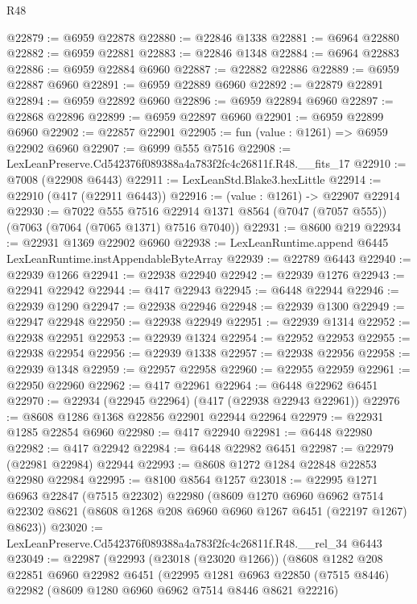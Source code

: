 \begin{lexlean}{R48}
\begin{coremodule}
@22879 := @6959 @22878
@22880 := @22846 @1338
@22881 := @6964 @22880
@22882 := @6959 @22881
@22883 := @22846 @1348
@22884 := @6964 @22883
@22886 := @6959 @22884 @6960
@22887 := @22882 @22886
@22889 := @6959 @22887 @6960
@22891 := @6959 @22889 @6960
@22892 := @22879 @22891
@22894 := @6959 @22892 @6960
@22896 := @6959 @22894 @6960
@22897 := @22868 @22896
@22899 := @6959 @22897 @6960
@22901 := @6959 @22899 @6960
@22902 := @22857 @22901
@22905 := fun (value : @1261) => @6959 @22902 @6960
@22907 := @6999 @555 @7516
@22908 := LexLeanPreserve.Cd542376f089388a4a783f2fc4c26811f.R48.__fits_17
@22910 := @7008 (@22908 @6443)
@22911 := LexLeanStd.Blake3.hexLittle
@22914 := @22910 (@417 (@22911 @6443))
@22916 := (value : @1261) -> @22907 @22914
@22930 := @7022
    @555
    @7516
    @22914
    @1371
    @8564
    (@7047 (@7057 @555))
    (@7063 (@7064 (@7065 @1371) @7516 @7040))
@22931 := @8600 @219
@22934 := @22931 @1369 @22902 @6960
@22938 := LexLeanRuntime.append @6445 LexLeanRuntime.instAppendableByteArray
@22939 := @22789 @6443
@22940 := @22939 @1266
@22941 := @22938 @22940
@22942 := @22939 @1276
@22943 := @22941 @22942
@22944 := @417 @22943
@22945 := @6448 @22944
@22946 := @22939 @1290
@22947 := @22938 @22946
@22948 := @22939 @1300
@22949 := @22947 @22948
@22950 := @22938 @22949
@22951 := @22939 @1314
@22952 := @22938 @22951
@22953 := @22939 @1324
@22954 := @22952 @22953
@22955 := @22938 @22954
@22956 := @22939 @1338
@22957 := @22938 @22956
@22958 := @22939 @1348
@22959 := @22957 @22958
@22960 := @22955 @22959
@22961 := @22950 @22960
@22962 := @417 @22961
@22964 := @6448 @22962 @6451
@22970 := @22934 (@22945 @22964) (@417 (@22938 @22943 @22961))
@22976 := @8608 @1286 @1368 @22856 @22901 @22944 @22964
@22979 := @22931 @1285 @22854 @6960
@22980 := @417 @22940
@22981 := @6448 @22980
@22982 := @417 @22942
@22984 := @6448 @22982 @6451
@22987 := @22979 (@22981 @22984) @22944
@22993 := @8608 @1272 @1284 @22848 @22853 @22980 @22984
@22995 := @8100 @8564 @1257
@23018 := @22995
    @1271
    @6963
    @22847
    (@7515 @22302)
    @22980
    (@8609
      @1270
      @6960
      @6962
      @7514
      @22302
      @8621
      (@8608 @1268 @208 @6960 @6960 @1267 @6451 (@22197 @1267) @8623))
@23020 := LexLeanPreserve.Cd542376f089388a4a783f2fc4c26811f.R48.__rel_34 @6443
@23049 := @22987
    (@22993
      (@23018 (@23020 @1266))
      (@8608
        @1282
        @208
        @22851
        @6960
        @22982
        @6451
        (@22995
          @1281
          @6963
          @22850
          (@7515 @8446)
          @22982
          (@8609 @1280 @6960 @6962 @7514 @8446 @8621 @22216)

\end{coremodule}
\end{lexlean}
